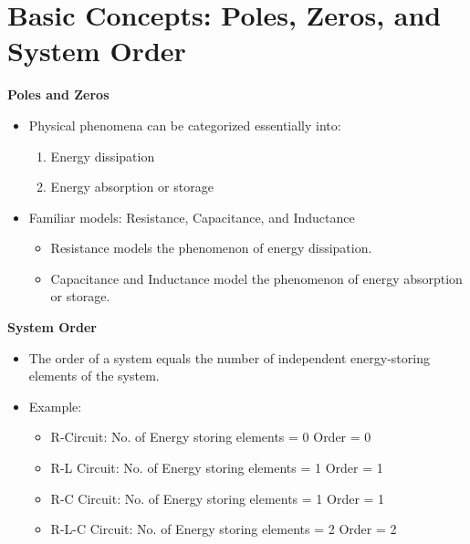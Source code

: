 \documentclass[../notes-main.tex]{subfiles}
\begin{document}
\section{Basic Concepts: Poles, Zeros, and System Order}
\textbf{Poles and Zeros}
\begin{itemize}
    \item Physical phenomena can be categorized essentially into:
    \begin{enumerate}
        \item Energy dissipation
        \item Energy absorption or storage
    \end{enumerate}
    \item Familiar models: Resistance, Capacitance, and Inductance
    \begin{itemize}
        \item Resistance models the phenomenon of energy dissipation.
        \item Capacitance and Inductance model the phenomenon of energy absorption or storage.
    \end{itemize}
\end{itemize}

\textbf{System Order}
\begin{itemize}
    \item The order of a system equals the number of independent energy-storing elements of the system.
    \item Example:
    \begin{itemize}
        \item R-Circuit: No. of Energy storing elements = 0 Order = 0
        \item R-L Circuit: No. of Energy storing elements = 1 Order = 1
        \item R-C Circuit: No. of Energy storing elements = 1 Order = 1
        \item R-L-C Circuit: No. of Energy storing elements = 2 Order = 2
    \end{itemize}
\end{itemize}
\end{document}
